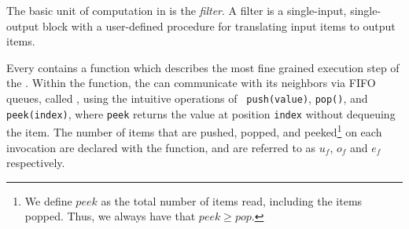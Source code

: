 The basic unit of computation in {\StreamIt} is the {\it filter}.  A
filter is a single-input, single-output block with a user-defined
procedure for translating input items to output items.
\begin{comment}
An example of a filter is the {\tt FIRFilter}, a component of our
software radio (see Figure \ref{fig:radiocode}). Each filter
contains an {\tt init} function that is called at initialization
time; in this case, the {\tt FIRFilter} calculates {\tt weights},
which represents its impulse response.
\end{comment}
Every {\filter} contains a {\work} function which describes the most
fine grained execution step of the {\filter}. Within the {\work}
function, the {\filter} can communicate with its neighbors via FIFO
queues, called {\Channels}, using the intuitive operations of {\tt
push(value)}, {\tt pop()}, and {\tt peek(index)}, where {\tt peek}
returns the value at position {\tt index} without dequeuing the
item.  The number of items that are pushed, popped, and
peeked\footnote{We define $peek$ as the total number of items
read, including the items popped.  Thus, we always have that $peek
\ge pop$.} on each invocation are declared with the {\work}
function, and are referred to as $u_f$, $o_f$ and $e_f$
respectively.

\begin{comment}
In addition to {\tt work}, a filter can contain a {\tt prework}
function that is executed exactly once between initialization and
the steady-state.  Like {\tt work}, {\tt prework} can access the
input and output tapes of the filter; however, the I/O rates of
{\tt work} and {\tt prework} can differ. In an {\tt FIRFilter}, a
{\tt prework} function is essential for correctly filtering the
beginning of the input stream.  The user never calls the {\tt
init}, {\tt prework}, and {\tt work} functions--they are all
called automatically.
\end{comment}



